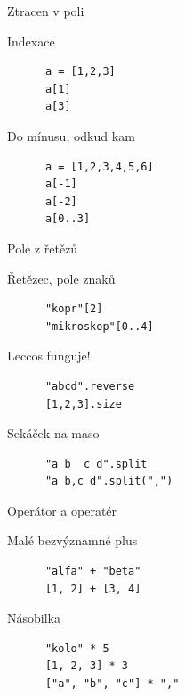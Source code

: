 \documentclass{beamer}
\begin{document}
\begin{frame}[fragile]{Ztracen v poli}
  \begin{block}{Indexace}
    \begin{verbatim}
      a = [1,2,3]
      a[1]
      a[3]
    \end{verbatim}
  \end{block}
  \pause
  \begin{block}{Do mínusu, odkud kam}
    \begin{verbatim}
      a = [1,2,3,4,5,6]
      a[-1]
      a[-2]
      a[0..3]
    \end{verbatim}
  \end{block}
\end{frame}

\begin{frame}[fragile]{Pole z řetězů}
  \begin{block}{Řetězec, pole znaků}
    \begin{verbatim}
      "kopr"[2]
      "mikroskop"[0..4]
    \end{verbatim}
  \end{block}
  \pause
  \begin{block}{Leccos funguje!}
    \begin{verbatim}
      "abcd".reverse
      [1,2,3].size
    \end{verbatim}
  \end{block}
  \begin{block}{Sekáček na maso}
    \begin{verbatim}
      "a b  c d".split
      "a b,c d".split(",")
    \end{verbatim}
  \end{block}
\end{frame}

\begin{frame}[fragile]{Operátor a operatér}
  \begin{block}{Malé bezvýznamné plus}
    \begin{verbatim}
      "alfa" + "beta"
      [1, 2] + [3, 4]
    \end{verbatim}
  \end{block}
  \pause
  \begin{block}{Násobilka}
    \begin{verbatim}
      "kolo" * 5
      [1, 2, 3] * 3
      ["a", "b", "c"] * ","
    \end{verbatim}
  \end{block}
\end{frame}
\end{document}
